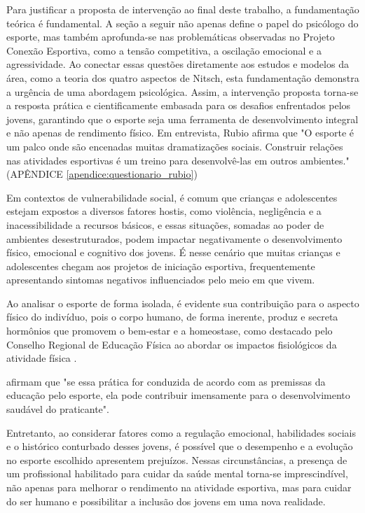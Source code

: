 \begin{Desenvolvimento}
Para justificar a proposta de intervenção ao final deste trabalho, a fundamentação teórica é fundamental. A seção a seguir não apenas define o papel do psicólogo do esporte, mas também aprofunda-se nas problemáticas observadas no Projeto Conexão Esportiva, como a tensão competitiva, a oscilação emocional e a agressividade. Ao conectar essas questões diretamente aos estudos e modelos da área, como a teoria dos quatro aspectos de Nitsch, esta fundamentação demonstra a urgência de uma abordagem psicológica. Assim, a intervenção proposta torna-se a resposta prática e cientificamente embasada para os desafios enfrentados pelos jovens, garantindo que o esporte seja uma ferramenta de desenvolvimento integral e não apenas de rendimento físico.
Em entrevista, Rubio afirma que "O esporte é um palco onde são encenadas muitas dramatizações sociais. Construir relações nas atividades esportivas é um treino para desenvolvê-las em outros ambientes." (APÊNDICE \ref{apendice:questionario_rubio})

Em contextos de vulnerabilidade social, é comum que crianças e adolescentes estejam expostos a diversos fatores hostis, como violência, negligência e a inacessibilidade a recursos básicos, e essas situações, somadas ao poder de ambientes desestruturados, podem impactar negativamente o desenvolvimento físico, emocional e cognitivo dos jovens. É nesse cenário que muitas crianças e adolescentes chegam aos projetos de iniciação esportiva, frequentemente apresentando sintomas negativos influenciados pelo meio em que vivem.

Ao analisar o esporte de forma isolada, é evidente sua contribuição para o aspecto físico do indivíduo, pois o corpo humano, de forma inerente, produz e secreta hormônios que promovem o bem-estar e a homeostase, como destacado pelo Conselho Regional de Educação Física ao abordar os impactos fisiológicos da atividade física .

 afirmam que "se essa prática for conduzida de acordo com as premissas da educação pelo esporte, ela pode contribuir imensamente para o desenvolvimento saudável do praticante".

Entretanto, ao considerar fatores como a regulação emocional, habilidades sociais e o histórico conturbado desses jovens, é possível que o desempenho e a evolução no esporte escolhido apresentem prejuízos. Nessas circunstâncias, a presença de um profissional habilitado para cuidar da saúde mental torna-se imprescindível, não apenas para melhorar o rendimento na atividade esportiva, mas para cuidar do ser humano e possibilitar a inclusão dos jovens em uma nova realidade.


\end{Desenvolvimento}
